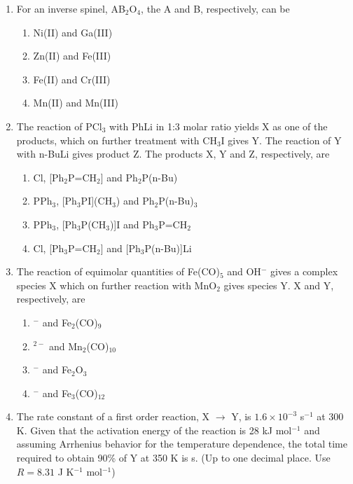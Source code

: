\documentclass{article}
\begin{document}
\begin{enumerate}
\item For an inverse spinel, AB$_2$O$_4$, the A and B, respectively, can be
\begin{multicols}{2}
\begin{enumerate}
    \item Ni(II) and Ga(III)
    \item Zn(II) and Fe(III)
    \item Fe(II) and Cr(III)
    \item Mn(II) and Mn(III)
\end{enumerate}
\end{multicols}

\item The reaction of PCl$_3$ with PhLi in 1:3 molar ratio yields X as one of the products, which on further treatment with CH$_3$I gives Y. The reaction of Y with n-BuLi gives product Z. The products X, Y and Z, respectively, are
\begin{multicols}{2}
\begin{enumerate}
    \item  \bark[PPh$_4$]Cl, [Ph$_2$P=CH$_2$] and Ph$_2$P(n-Bu)
    \item PPh$_3$, [Ph$_3$PI](CH$_3$) and Ph$_2$P(n-Bu)$_3$
    \item PPh$_3$, [Ph$_3$P(CH$_3$)]I and Ph$_3$P=CH$_2$
    \item \bark[PPh$_4$]Cl, [Ph$_3$P=CH$_2$] and [Ph$_3$P(n-Bu)]Li
\end{enumerate}
\end{multicols}


\item The reaction of equimolar quantities of Fe(CO)$_5$ and OH$^-$ gives a complex species X which 
on further reaction with MnO$_2$ gives species Y. X and Y, respectively, are
\begin{multicols}{2}
\begin{enumerate}
    \item \bark[Fe(CO)$_5$(OH)]$^-$ and Fe$_2$(CO)$_9$
    \item \bark[Fe(CO)$_4$]$^{2-}$ and Mn$_2$(CO)$_{10}$
    \item \bark[HFe(CO)$_4$]$^-$ and Fe$_2$O$_3$
    \item \bark[HFe(CO)$_4$]$^-$ and Fe$_3$(CO)$_{12}$
\end{enumerate}
\end{multicols}

\item The rate constant of a first order reaction, X $\to$ Y, is $1.6\times 10^{-3}$ s$^{-1}$ at 300 K. 
Given that the activation energy of the reaction is 28 kJ mol$^{-1}$ and assuming Arrhenius behavior 
for the temperature dependence, the total time required to obtain 90\% of Y at 350 K 
is \underline{\hspace{2cm}} s. (Up to one decimal place. Use $R = 8.31$ J K$^{-1}$ mol$^{-1}$)


\end{enumerate}
\end{document}
